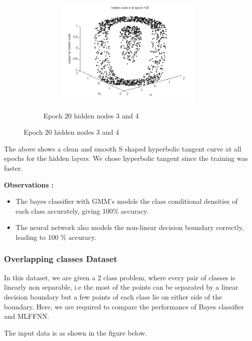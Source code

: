 \documentclass{article}
\begin{document}
\begin{figure}
\begin{figure}
\begin{subfigure}{.5\textwidth}
\end{subfigure}%
\begin{subfigure}{.5\textwidth}
  \centering
  \includegraphics[width=.8\linewidth]{Classification/nonlinearlySeparable/h20_4}
  \end{subfigure}
\caption{Epoch 20 hidden nodes 3 and 4}
\end{figure}
\end{figure}
The above shows a clean and smooth S shaped hyperbolic tangent curve at all epochs for the hidden layers. We chose hyperbolic tangent since the training was faster.

\textbf{Observations :} 
\begin{itemize}
\item The bayes classifier with GMM's models the class conditional densities of each class accurately, giving 100\% accuracy.
\item The neural network also models the non-linear decision boundary correctly, leading to 100 \% accuracy.

\end{itemize}
\newpage
\subsubsection{Overlapping classes Dataset}
\begin{flushleft}
In this dataset, we are given a 2 class problem, where every pair of classes is linearly non separable, i.e the most of the points can be separated by a linear decision boundary but a few points of each class lie on either side of the boundary. Here, we are required to compare the performance of Bayes classifier and MLFFNN.

The input data is as shown in the figure below. \\[10pt]
\end{flushleft}
\end{document}
